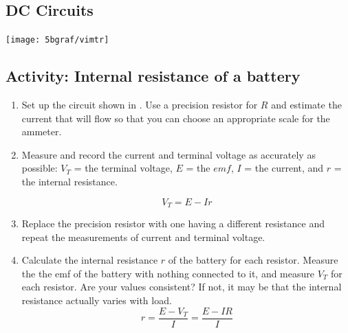 \begin{multicols}{2}
\section {DC Circuits}


\begin{center}
	\texttt{[image: 5bgraf/vimtr]} %
	\label{f:vimtr}
\end{center}

\subsection{Activity: Internal resistance of a battery}
\begin{enumerate}
	 \item Set up the circuit shown in .  Use a precision resistor for $R$ and estimate the current that will flow so that you can choose an appropriate scale for the ammeter.
	\item Measure and record the current and terminal voltage as accurately as possible: $V_T$ = the terminal voltage, $E$ = the $emf$, $I$ = the current, and $r$ = the internal resistance.

\begin{equation} \label{e:vterm}
	V_T  =  E -Ir 	%
\end{equation}
	\item Replace the precision resistor with one having a different resistance and repeat the measurements of current and terminal voltage.
	\item Calculate the internal resistance $r$ of the battery for each resistor. Measure the the emf of the battery with nothing connected to it, and measure $V_T$ for each resistor.  Are your values consistent?  If not, it may be that the internal resistance actually varies with load.
\begin{equation} \label{e:rintern}
	r  =  \dfrac{E - V_T}{I} = \dfrac{E - IR}{I}	%
\end{equation}


\end{enumerate}
\end{multicols}
